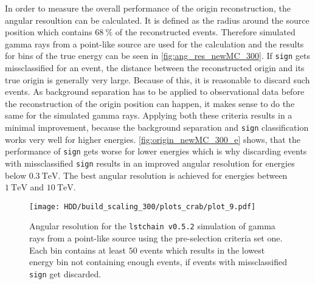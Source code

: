 In order to measure the overall performance of the origin reconstruction, the angular resoultion can be calculated.
It is defined as the radius around the source position which contains $\SI{68}{\percent}$ of the reconstructed events.
Therefore simulated gamma rays from a point-like source are used for the calculation and the results for bins of the true energy can be seen in \autoref{fig:ang_res_newMC_300}.
If \texttt{sign} gets missclassified for an event, the distance between the reconstructed origin and its true origin is generally very large.
Because of this, it is reasonable to discard such events.
As background separation has to be applied to observational data before the reconstruction of the origin position can happen, it makes sense to do the same
for the simulated gamma rays.
Applying both these criteria results in a minimal improvement, because the background separation and \texttt{sign} classification works very well for higher energies.
\autoref{fig:origin_newMC_300_e} shows, that the performance of \texttt{sign} gets worse for lower energies which is why discarding events with missclassified  
\texttt{sign} results in an improved angular resolution for energies below $\SI{0.3}{\tera\electronvolt}$.
The best angular resolution is achieved for energies between $\SI{1}{\tera\electronvolt}$ and $\SI{10}{\tera\electronvolt}$.
\begin{figure}
    \centering
    \texttt{[image: HDD/build\_scaling\_300/plots\_crab/plot\_9.pdf]}
    \caption{Angular resolution for the \texttt{lstchain v0.5.2} simulation of gamma rays from a point-like source using the pre-selection criteria set one.
        Each bin contains at least $\num{50}$ events which results in the lowest energy bin not containing enough events, if events with missclassified \texttt{sign} 
        get discarded.
    }
    \label{fig:ang_res_newMC_300}
\end{figure}

